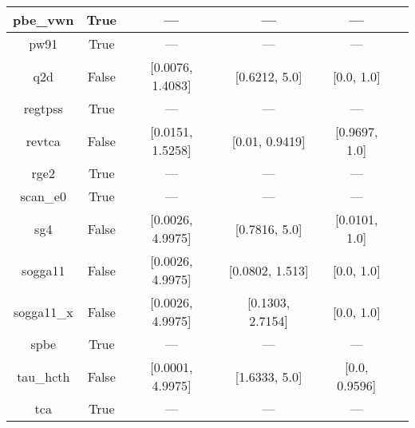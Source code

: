 \begin{tabular}{|c|c|c|c|c|l|}
       pbe\_vwn &                  True &               --- &               --- &               --- &  \cite{Kraisler2010_042516,Perdew1996_3865,Perdew1996_3865_err} \\ \hline
           pw91 &                  True &               --- &               --- &               --- &           \cite{Perdew1991,Perdew1992_6671,Perdew1992_6671_err} \\ \hline
            q2d &                 False &  [0.0076, 1.4083] &     [0.6212, 5.0] &        [0.0, 1.0] &                                        \cite{Chiodo2012_126402} \\ \hline
        regtpss &                  True &               --- &               --- &               --- &                                        \cite{Perdew2009_026403} \\ \hline
         revtca &                 False &  [0.0151, 1.5258] &    [0.01, 0.9419] &     [0.9697, 1.0] &                                         \cite{Tognetti2008_536} \\ \hline
           rge2 &                  True &               --- &               --- &               --- &                                       \cite{Ruzsinszky2009_763} \\ \hline
       scan\_e0 &                  True &               --- &               --- &               --- &                                           \cite{Sun2015_036402} \\ \hline
            sg4 &                 False &  [0.0026, 4.9975] &     [0.7816, 5.0] &     [0.0101, 1.0] &                                    \cite{Constantin2016_045126} \\ \hline
        sogga11 &                 False &  [0.0026, 4.9975] &   [0.0802, 1.513] &        [0.0, 1.0] &                                        \cite{Peverati2011_1991} \\ \hline
     sogga11\_x &                 False &  [0.0026, 4.9975] &  [0.1303, 2.7154] &        [0.0, 1.0] &                                      \cite{Peverati2011_191102} \\ \hline
           spbe &                  True &               --- &               --- &               --- &                                         \cite{Swart2009_094103} \\ \hline
      tau\_hcth &                 False &  [0.0001, 4.9975] &     [1.6333, 5.0] &     [0.0, 0.9596] &                                           \cite{Boese2002_9559} \\ \hline
            tca &                  True &               --- &               --- &               --- &                                      \cite{Tognetti2008_034101} \\ \hline

\end{tabular}
